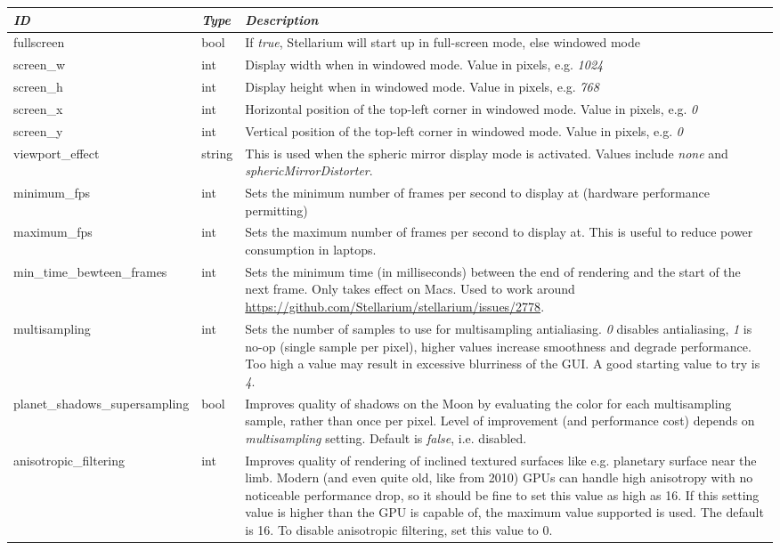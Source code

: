 \begin{longtable}{l|l|p{80mm}}\toprule
\emph{ID}  & \emph{Type} & \emph{Description}\\\midrule
fullscreen       & bool   & If \emph{true}, Stellarium will start up in full-screen mode, else windowed mode\\%
screen\_w        & int    & Display width when in windowed mode. Value in pixels, e.g. \emph{1024}\\%
screen\_h        & int    & Display height when in windowed mode. Value in pixels, e.g. \emph{768}\\%
screen\_x        & int    & Horizontal position of the top-left corner in windowed mode. Value in pixels, e.g. \emph{0}\\%
screen\_y        & int    & Vertical   position of the top-left corner in windowed mode. Value in pixels, e.g. \emph{0}\\%
viewport\_effect & string & This is used when the spheric mirror display mode is activated. Values include \emph{none} and \emph{sphericMirrorDistorter}.\\%
minimum\_fps     & int    & Sets the minimum number of frames per second to display at (hardware performance permitting)\\%
maximum\_fps     & int    & Sets the maximum number of frames per second to display at. This is useful to reduce power consumption in laptops.\\%
min\_time\_bewteen\_frames & int & Sets the minimum time (in milliseconds) between the end of rendering and the start of the next frame. Only takes effect on Macs. Used to work around \url{https://github.com/Stellarium/stellarium/issues/2778}.\\
multisampling    & int    & Sets the number of samples to use for multisampling antialiasing. \emph{0} disables antialiasing, \emph{1} is no-op (single sample per pixel), 
                            higher values increase smoothness and degrade performance. Too high a value may result in excessive blurriness of the GUI. A good starting value to try is \emph{4}.\\
planet\_shadows\_supersampling & bool & Improves quality of shadows on the Moon by evaluating the color for each multisampling sample, rather than once per pixel. 
                                        Level of improvement (and performance cost) depends on \emph{multisampling} setting. Default is \emph{false}, i.e. disabled.\\
anisotropic\_filtering         & int  & Improves quality of rendering of inclined textured surfaces like e.g. planetary surface near the limb. 
                                        Modern (and even quite old, like from 2010) GPUs can handle high anisotropy with no noticeable performance drop, so it should be fine to set this value as high as 16. 
										If this setting value is higher than the GPU is capable of, the maximum value supported is used. The default is 16. To disable anisotropic filtering, set this value to 0.\\
\bottomrule
\end{longtable}

